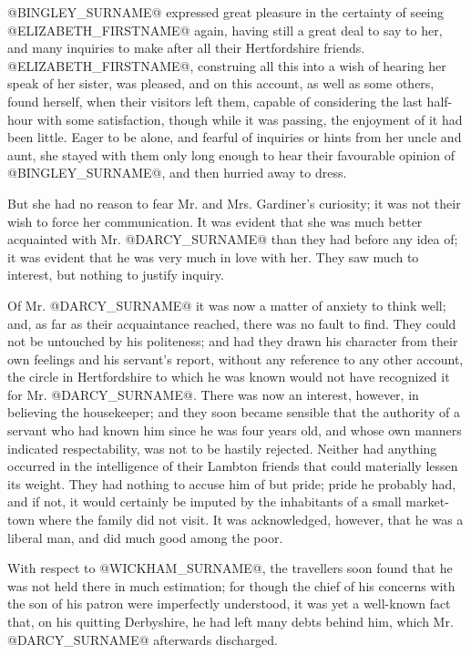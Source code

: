 @BINGLEY_SURNAME@ expressed great pleasure in the certainty of seeing @ELIZABETH_FIRSTNAME@
again, having still a great deal to say to her, and many inquiries to
make after all their Hertfordshire friends. @ELIZABETH_FIRSTNAME@, construing all
this into a wish of hearing her speak of her sister, was pleased, and on
this account, as well as some others, found herself, when their
visitors left them, capable of considering the last half-hour with some
satisfaction, though while it was passing, the enjoyment of it had been
little. Eager to be alone, and fearful of inquiries or hints from her
uncle and aunt, she stayed with them only long enough to hear their
favourable opinion of @BINGLEY_SURNAME@, and then hurried away to dress.

But she had no reason to fear Mr. and Mrs. Gardiner's curiosity; it was
not their wish to force her communication. It was evident that she was
much better acquainted with Mr. @DARCY_SURNAME@ than they had before any idea of;
it was evident that he was very much in love with her. They saw much to
interest, but nothing to justify inquiry.

Of Mr. @DARCY_SURNAME@ it was now a matter of anxiety to think well; and, as far
as their acquaintance reached, there was no fault to find. They could
not be untouched by his politeness; and had they drawn his character
from their own feelings and his servant's report, without any reference
to any other account, the circle in Hertfordshire to which he was known
would not have recognized it for Mr. @DARCY_SURNAME@. There was now an interest,
however, in believing the housekeeper; and they soon became sensible
that the authority of a servant who had known him since he was four
years old, and whose own manners indicated respectability, was not to be
hastily rejected. Neither had anything occurred in the intelligence of
their Lambton friends that could materially lessen its weight. They had
nothing to accuse him of but pride; pride he probably had, and if not,
it would certainly be imputed by the inhabitants of a small market-town
where the family did not visit. It was acknowledged, however, that he
was a liberal man, and did much good among the poor.

With respect to @WICKHAM_SURNAME@, the travellers soon found that he was not held
there in much estimation; for though the chief of his concerns with the
son of his patron were imperfectly understood, it was yet a well-known
fact that, on his quitting Derbyshire, he had left many debts behind
him, which Mr. @DARCY_SURNAME@ afterwards discharged.

